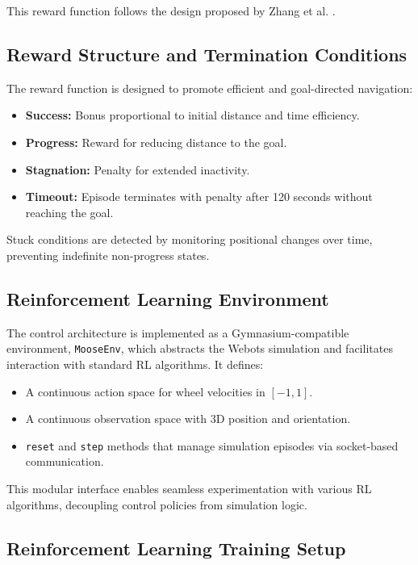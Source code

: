 \documentclass[11pt,twocolumn]{article}
\begin{document}
This reward function follows the design proposed by Zhang et al. \cite{Zhang2018DRL}.

\subsection{Reward Structure and Termination Conditions}

The reward function is designed to promote efficient and goal-directed navigation:

\begin{itemize}
    \item \textbf{Success:} Bonus proportional to initial distance and time efficiency.
    \item \textbf{Progress:} Reward for reducing distance to the goal.
    \item \textbf{Stagnation:} Penalty for extended inactivity.
    \item \textbf{Timeout:} Episode terminates with penalty after 120 seconds without reaching the goal.
\end{itemize}

Stuck conditions are detected by monitoring positional changes over time, preventing indefinite non-progress states.

\subsection{Reinforcement Learning Environment}

The control architecture is implemented as a Gymnasium-compatible environment, \texttt{MooseEnv}, which abstracts the Webots simulation and facilitates interaction with standard RL algorithms. It defines:

\begin{itemize}
    \item A continuous action space for wheel velocities in \([-1, 1]\).
    \item A continuous observation space with 3D position and orientation.
    \item \texttt{reset} and \texttt{step} methods that manage simulation episodes via socket-based communication.
\end{itemize}

This modular interface enables seamless experimentation with various RL algorithms, decoupling control policies from simulation logic.

\subsection{Reinforcement Learning Training Setup}
\end{document}
